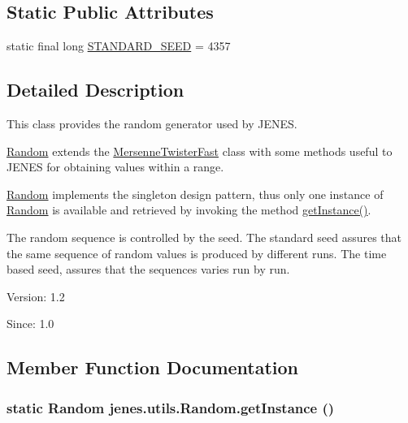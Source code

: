 \subsection*{Static Public Attributes}
\begin{CompactItemize}
\item 
static final long \hyperlink{classjenes_1_1utils_1_1_random_ee05c4e6476472dc9dc02d2fd94061b5}{STANDARD\_\-SEED} = 4357
\end{CompactItemize}


\subsection{Detailed Description}
This class provides the random generator used by JENES. 

\hyperlink{classjenes_1_1utils_1_1_random}{Random} extends the \hyperlink{classjenes_1_1utils_1_1_mersenne_twister_fast}{MersenneTwisterFast} class with some methods useful to JENES for obtaining values within a range.  

\hyperlink{classjenes_1_1utils_1_1_random}{Random} implements the singleton design pattern, thus only one instance of \hyperlink{classjenes_1_1utils_1_1_random}{Random} is available and retrieved by invoking the method \hyperlink{classjenes_1_1utils_1_1_random_a8b8341f82ccf69de0b44c9f6f174820}{getInstance()}.  

The random sequence is controlled by the seed. The standard seed assures that the same sequence of random values is produced by different runs. The time based seed, assures that the sequences varies run by run. 

\begin{Desc}
\item[Version:]1.2 \end{Desc}
\begin{Desc}
\item[Since:]1.0 \end{Desc}


\subsection{Member Function Documentation}
\hypertarget{classjenes_1_1utils_1_1_random_a8b8341f82ccf69de0b44c9f6f174820}{
\subsubsection[getInstance]{\setlength{\rightskip}{0pt plus 5cm}static {\bf Random} jenes.utils.Random.getInstance ()}}
\label{classjenes_1_1utils_1_1_random_a8b8341f82ccf69de0b44c9f6f174820}


